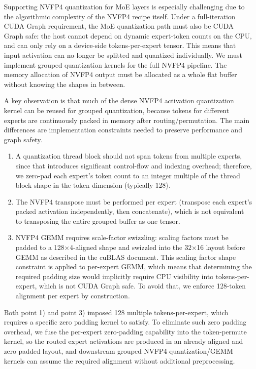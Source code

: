 \documentclass[10pt,logo,copyright]{nvidiatechreport}
\begin{document}
Supporting NVFP4 quantization for MoE layers is especially challenging due to the algorithmic complexity of the NVFP4 recipe itself. Under a full-iteration CUDA Graph requirement, the MoE quantization path must also be CUDA Graph safe: the host cannot depend on dynamic expert-token counts on the CPU, and can only rely on a device-side tokens-per-expert tensor. This means that input activation can no longer be splitted and quantized individually. We must implement grouped quantization kernels for the full NVFP4 pipeline. The memory allocation of NVFP4 output must be allocated as a whole flat buffer without knowing the shapes in between. 

A key observation is that much of the dense NVFP4 activation quantization kernel can be reused for grouped quantization, because tokens for different experts are continuously packed in memory after routing/permutation. The main differences are implementation constraints needed to preserve performance and graph safety. 

\begin{enumerate}

\item A quantization thread block should not span tokens from multiple experts, since that introduces significant control-flow and indexing overhead; therefore, we zero-pad each expert’s token count to an integer multiple of the thread block shape in the token dimension (typically 128). 

\item The NVFP4 transpose must be performed per expert (transpose each expert’s packed activation independently, then concatenate), which is not equivalent to transposing the entire grouped buffer as one tensor. 

\item NVFP4 GEMM requires scale-factor swizzling: scaling factors must be padded to a 128×4-aligned shape and swizzled into the 32×16 layout before GEMM as described in the cuBLAS document\cite{cublas_sf_layout}. This scaling factor shape constraint is applied to per-expert GEMM, which means that determining the required padding size would implicitly require CPU visibility into tokens-per-expert, which is not CUDA Graph safe. To avoid that, we enforce 128-token alignment per expert by construction.
\end{enumerate}

Both point 1) and point 3) imposed 128 multiple tokens-per-expert, which requires a specific zero padding kernel to satisfy. To eliminate such zero padding overhead, we fuse the per-expert zero-padding capability into the token-permute kernel, so the routed expert activations are produced in an already aligned and zero padded layout, and downstream grouped NVFP4 quantization/GEMM kernels can assume the required alignment without additional preprocessing.
\end{document}
